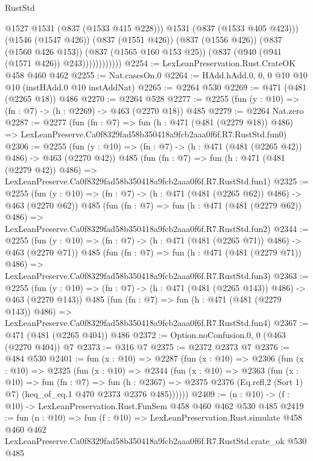\begin{lexlean}{RustStd}
\begin{coremodule}
                            @1527
                            @1531
                            (@837 (@1533 @415 @228)))
                          @1531
                          (@837 (@1533 @405 @423)))
                        (@1546 (@1547 @426))
                        (@837 (@1551 @426))
                        (@837 (@1556 @426))
                        (@837 (@1560 @426 @153))
                        (@837 (@1565 @160 @153 @25))
                        (@837 (@940 (@941 (@1571 @426)) @243))))))))))))
@2254 := LexLeanPreservation.Rust.CrateOK @458 @460 @462
@2255 := Nat.casesOn.{0}
@2264 := HAdd.hAdd.{0, 0, 0} @10 @10 @10 (instHAdd.{0} @10 instAddNat)
@2265 := @2264 @530
@2269 := @471 (@481 (@2265 @18)) @486
@2270 := @2264 @528
@2277 := @2255 (fun (y : @10) => (fn : @7) -> (h : @2269) -> @463 (@2270 @18)) @485
@2279 := @2264 Nat.zero
@2287 := @2277
    (fun (fn : @7) =>
    fun (h : @471 (@481 (@2279 @18)) @486) =>
    LexLeanPreserve.Ca0f8329fad58b350418a9fcb2aaa0f6f.R7.RustStd.fun0)
@2306 := @2255
    (fun (y : @10) => (fn : @7) -> (h : @471 (@481 (@2265 @42)) @486) -> @463 (@2270 @42))
    @485
    (fun (fn : @7) =>
    fun (h : @471 (@481 (@2279 @42)) @486) =>
    LexLeanPreserve.Ca0f8329fad58b350418a9fcb2aaa0f6f.R7.RustStd.fun1)
@2325 := @2255
    (fun (y : @10) => (fn : @7) -> (h : @471 (@481 (@2265 @62)) @486) -> @463 (@2270 @62))
    @485
    (fun (fn : @7) =>
    fun (h : @471 (@481 (@2279 @62)) @486) =>
    LexLeanPreserve.Ca0f8329fad58b350418a9fcb2aaa0f6f.R7.RustStd.fun2)
@2344 := @2255
    (fun (y : @10) => (fn : @7) -> (h : @471 (@481 (@2265 @71)) @486) -> @463 (@2270 @71))
    @485
    (fun (fn : @7) =>
    fun (h : @471 (@481 (@2279 @71)) @486) =>
    LexLeanPreserve.Ca0f8329fad58b350418a9fcb2aaa0f6f.R7.RustStd.fun3)
@2363 := @2255
    (fun (y : @10) => (fn : @7) -> (h : @471 (@481 (@2265 @143)) @486) -> @463 (@2270 @143))
    @485
    (fun (fn : @7) =>
    fun (h : @471 (@481 (@2279 @143)) @486) =>
    LexLeanPreserve.Ca0f8329fad58b350418a9fcb2aaa0f6f.R7.RustStd.fun4)
@2367 := @471 (@481 (@2265 @404)) @486
@2372 := Option.noConfusion.{0, 0} (@463 (@2270 @404)) @7
@2373 := @316 @7
@2375 := @2372 @2373 @7
@2376 := @484 @530
@2401 := fun (x : @10) =>
  @2287
    (fun (x : @10) =>
    @2306
      (fun (x : @10) =>
      @2325
        (fun (x : @10) =>
        @2344
          (fun (x : @10) =>
          @2363
            (fun (x : @10) =>
            fun (fn : @7) =>
            fun (h : @2367) =>
            @2375 @2376 (Eq.refl.{2} (Sort 1) @7) (heq_of_eq.{1} @470 @2373 @2376 @485))))))
@2409 := (n : @10) -> (f : @10) -> LexLeanPreservation.Rust.FunSem @458 @460 @462 @530 @485
@2419 := fun (n : @10) =>
  fun (f : @10) =>
  LexLeanPreservation.Rust.simulate
    @458
    @460
    @462
    LexLeanPreserve.Ca0f8329fad58b350418a9fcb2aaa0f6f.R7.RustStd.crate_ok
    @530
    @485
\end{coremodule}
\end{lexlean}
